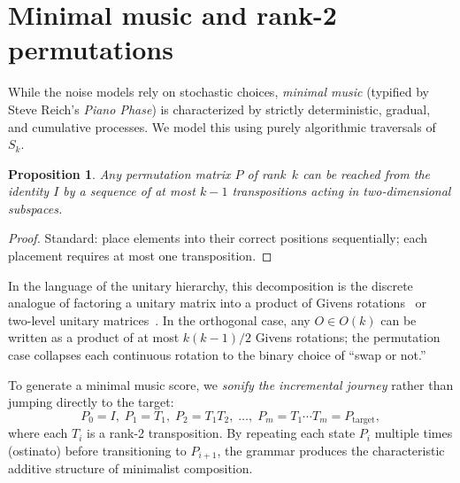 \documentclass[
  twocolumn,
  aps,
  pra,
  showkeys,
  amsmath,amssymb,
  longbibliography
]{revtex4-2}
\newtheorem{proposition}{Proposition}
\begin{document}
\section{Minimal music and rank-2 permutations}
\label{sec:minimal}

While the noise models rely on stochastic choices,
\emph{minimal music} (typified by Steve Reich's
\emph{Piano Phase}) is characterized by strictly
deterministic, gradual, and cumulative processes.
We model this using purely algorithmic traversals of~$S_k$.

\begin{proposition}
Any permutation matrix $P$ of rank~$k$ can be reached from
the identity $I$ by a sequence of at most $k-1$ transpositions
acting in two-dimensional subspaces.
\end{proposition}

\begin{proof}
Standard: place elements into their correct positions
sequentially; each placement requires at most one
transposition.
\end{proof}

In the language of the unitary hierarchy, this decomposition
is the discrete analogue of factoring a unitary matrix into a
product of Givens rotations~\cite{golub-vanloan-13} or
two-level unitary matrices~\cite{nielsen-chuang-00}.
In the orthogonal case, any $O\in O(k)$ can be written as a
product of at most $k(k-1)/2$ Givens rotations; the
permutation case collapses each continuous rotation to the
binary choice of ``swap or not.''

To generate a minimal music score, we \emph{sonify the
incremental journey} rather than jumping directly to the
target:
\begin{equation}
P_0 = I,\;
P_1 = T_1,\;
P_2 = T_1 T_2,\;
\ldots,\;
P_m = T_1\cdots T_m = P_{\mathrm{target}},
\label{eq:minpath}
\end{equation}
where each $T_i$ is a rank-2 transposition.
By repeating each state $P_i$ multiple times (ostinato) before
transitioning to $P_{i+1}$, the grammar produces the
characteristic additive structure of minimalist composition.
\end{document}
